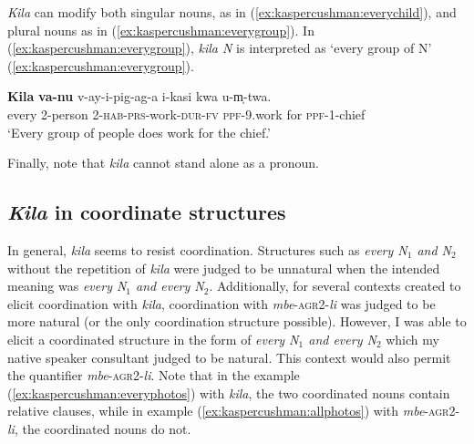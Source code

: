 \documentclass[output=paper,modfonts,nonflat]{langsci/langscibook}
\begin{document}
\begin{exe} 
\ex \begin{xlist}


\end{xlist}
\end{exe} 

\textit{Kila} can modify both singular nouns, as in (\ref{ex:kaspercushman:everychild}), and plural nouns as in (\ref{ex:kaspercushman:everygroup}). In (\ref{ex:kaspercushman:everygroup}), \textit{kila N} is interpreted as `every group of N' (\ref{ex:kaspercushman:everygroup}).   


\begin{exe}

\ex 
\gll \textbf{Kila} \textbf{va-nu} v-ay-i-pig-ag-a i-kasi kwa u-m̩-twa.\\
every 2-person 2-\textsc{hab}-\textsc{prs}-work-\textsc{dur}-\textsc{fv} \textsc{ppf}-9.work for \textsc{ppf}-1-chief \\
\glt `Every group of people does work for the chief.' \label{ex:kaspercushman:everygroup}

\end{exe}

Finally, note that \textit{kila} cannot stand alone as a pronoun.

\subsection{\textit{Kila} in coordinate structures}

In general, \textit{kila} seems to resist coordination. Structures such as \textit{every N$_{1}$ and N$_{2}$} without the repetition of \textit{kila} were judged to be unnatural when the intended meaning was \textit{every N$_{1}$ and every N$_{2}$}.  Additionally, for several contexts created to elicit coordination with \textit{kila}, coordination with \textit{mbe}-\textsc{agr2}-\textit{li} was judged to be more natural (or the only coordination structure possible). However, I was able to elicit a coordinated structure in the form of \textit{every N$_{1}$ and every N$_{2}$} which my native speaker consultant judged to be natural. This context would also permit the quantifier \textit{mbe}-\textsc{agr2}-\textit{li}.  Note that in the example (\ref{ex:kaspercushman:everyphotos}) with \textit{kila}, the two coordinated nouns contain relative clauses, while in example (\ref{ex:kaspercushman:allphotos}) with \textit{mbe}-\textsc{agr2}-\textit{li}, the coordinated nouns do not.
\end{document}
